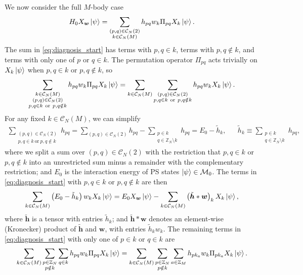 \documentclass[nofootinbib,notitlepage,11pt]{revtex4-2}
\renewcommand{\t}{\text} %
\newcommand{\p}[1]{\left(#1\right)} %
\newcommand{\m}{\bm} %
\newcommand{\1}{\mathds{1}}
\newcommand{\C}{\mathcal{C}}
\newcommand{\M}{\mathcal{M}}
\newcommand{\ZZ}{\mathbb{Z}}
\begin{document}
We now consider the full $M$-body case
\begin{align}
  H_0 X_{\m w} \ket\psi
  = \sum_{\substack{\p{p,q}\in\C_N\p{2}\\k\in\C_N\p{M}}}
  h_{pq} w_k \Pi_{pq} X_k \ket\psi.
  \label{eq:diagnosis_start}
\end{align}
The sum in \eqref{eq:diagnosis_start} has terms with $p,q\in k$, terms
with $p,q\notin k$, and terms with only one of $p$ or $q\in k$.  The
permutation operator $\Pi_{pq}$ acts trivially on $X_k\ket\psi$ when
$p,q\in k$ or $p,q\notin k$, so
\begin{align}
  \sum_{\substack{k\in\C_N\p{M}\\\p{p,q}\in\C_N\p{2}\\
      p,q\in k~\t{or}~p,q\notin k}}
  h_{pq} w_k \Pi_{pq} X_k \ket\psi
  = \sum_{k\in\C_N\p{M}}
  \sum_{\substack{\p{p,q}\in\C_N\p{2}\\p,q\in k~\t{or}~p,q\notin k}}
  h_{pq} w_k X_k \ket\psi.
\end{align}
For any fixed $k\in\C_N\p{M}$, we can simplify
\begin{align}
  \sum_{\substack{\p{p,q}\in\C_N\p{2}\\p,q\in k~\t{or}~p,q\notin k}} h_{pq}
  = \sum_{\p{p,q}\in\C_N\p{2}} h_{pq}
  - \sum_{\substack{p\in k\\q\in\ZZ_N\setminus k}} h_{pq}
  = E_0 - \tilde h_k,
  &&
  \tilde h_k \equiv \sum_{\substack{p\in k\\q\in\ZZ_N\setminus k}} h_{pq},
\end{align}
where we split a sum over $\p{p,q}\in\C_N\p{2}$ with the restriction
that $p,q\in k$ or $p,q\notin k$ into an unrestricted sum minus a
remainder with the complementary restriction; and $E_0$ is the
interaction energy of PS states $\ket\psi\in\M_0$.  The terms in
\eqref{eq:diagnosis_start} with $p,q\in k$ or $p,q\notin k$ are then
\begin{align}
  \sum_{k\in\C_N\p{M}} \p{E_0 - \tilde h_k} w_k X_k \ket\psi
  = E_0 X_{\m w} \ket\psi
  - \sum_{k\in\C_N\p{M}} \p{\tilde{\m h} * \m w}_k X_k \ket\psi,
\end{align}
where $\tilde{\m h}$ is a tensor with entries $\tilde h_k$; and
$\tilde{\m h} * \m w$ denotes an element-wise (Kronecker) product of
$\tilde{\m h}$ and $\m w$, with entries $\tilde h_k w_k$.  The
remaining terms in \eqref{eq:diagnosis_start} with only one of
$p\in k$ or $q\in k$ are
\begin{align}
  \sum_{k\in\C_N\p{M}} \sum_{\substack{p\in\ZZ_N\\p\notin k}} \sum_{q\in k}
  h_{pq} w_k \Pi_{pq} X_k \ket\psi
  = \sum_{k\in\C_N\p{M}} \sum_{\substack{p\in\ZZ_N\\p\notin k}}
  \sum_{a\in\ZZ_M} h_{p k_a} w_k \Pi_{p k_a} X_k \ket\psi.
\end{align}
\end{document}
